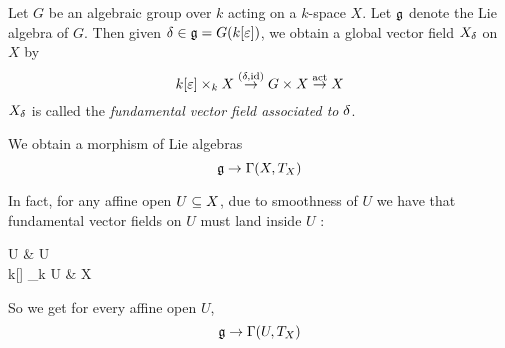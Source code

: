 \documentclass[./main.tex]{subfiles}
\begin{document}
\begin{dfn}
  
Let $G$ be an algebraic group over $k$ acting on
a $k$-space $X$.
Let $\mathfrak{g}$ denote the Lie algebra of $G$.
Then given $\delta \in \mathfrak{g} = G(k[\varepsilon])$,
we obtain a global vector field $X_\delta$ on $X$ by
\[
  k[\varepsilon] \times_k X \overset{(\delta , \mathrm{id})}{\rightarrow} 
  G \times X \overset{\mathrm{act}}{\rightarrow} X
\]
$X_\delta$ is called the \emph{fundamental vector field associated to $\delta$}.

We obtain a morphism of Lie algebras 
\[
  \mathfrak{g} \to \Gamma(X , T_X)
\]

In fact, for any affine open $U \subseteq X$, 
due to smoothness of $U$ we have that fundamental vector fields on $U$
must land inside $U$ : 
\begin{cd}
  U & U \\
	{k[\epsilon] \times_k U} & X
	\arrow[from=1-1, to=2-1]
	\arrow[from=1-2, to=2-2]
	\arrow["\id", from=1-1, to=1-2]
	\arrow[from=2-1, to=2-2]
	\arrow[dashed, from=2-1, to=1-2]
\end{cd}
So we get for every affine open $U$,
\[
  \mathfrak{g} \to \Gamma(U , T_X)
\]

\end{dfn}
\end{document}
